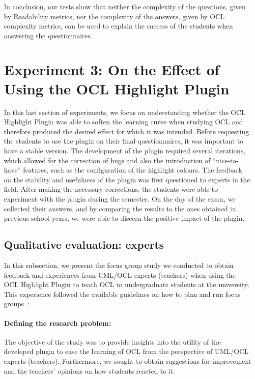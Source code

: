 In conclusion, our tests show that neither the complexity of the questions, given by Readability metrics, nor the complexity of the answers, given by OCL complexity metrics, can be used to explain the success of the students when answering the questionnaires.

\section{Experiment 3: On the Effect of Using the OCL Highlight Plugin}
\label{chap:Results-OCLHighlightPlugin}

In this last section of experiments, we focus on understanding whether the OCL Highlight Plugin was able to soften the learning curve when studying OCL and therefore produced the desired effect for which it was intended. Before requesting the students to use the plugin on their final questionnaires, it was important to have a stable version. The development of the plugin required several iterations, which allowed for the correction of bugs and also the introduction of “nice-to-have” features, such as the configuration of the highlight colours. The feedback on the stability and usefulness of the plugin was first questioned to experts in the field. After making the necessary corrections, the students were able to experiment with the plugin during the semester. On the day of the exam, we collected their answers, and by comparing the results to the ones obtained in previous school years, we were able to discern the positive impact of the plugin.

\subsection{Qualitative evaluation: experts}
\label{chap:Results-pluginExperts}

In this subsection, we present the focus group study we conducted to obtain feedback and experiences
from UML/OCL experts (teachers) when using the OCL Highlight Plugin to teach OCL to undergraduate students at the university. This experience followed the available guidelines on how to plan and run focus groups~\cite{Kontio2004}:

\paragraph{Defining the research problem:} The objective of the study was to provide insights into the utility of the developed plugin to ease the learning of OCL from the perspective of UML/OCL experts (teachers). Furthermore, we sought to obtain suggestions for improvement and the teachers' opinions on how students reacted to it.

